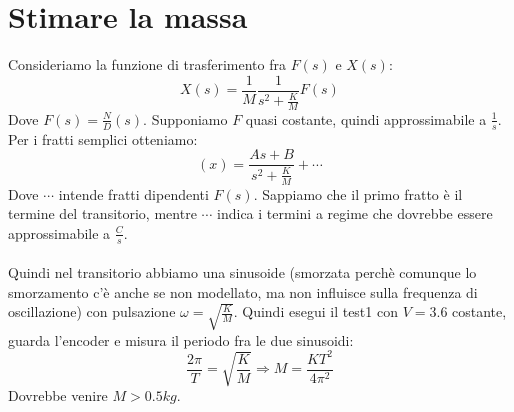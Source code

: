 \documentclass[10pt,a4paper]{article}
\begin{document}
\section{Stimare la massa}
Consideriamo la funzione di trasferimento fra $F(s)$ e $X(s)$:
$$X(s)= \frac{1}{M}\frac{1}{s^2+\frac{K}{M}}F(s)$$
Dove $F(s) = \frac{N}{D}(s)$. Supponiamo $F$ quasi costante, quindi approssimabile a $\frac{1}{s}$. Per i fratti semplici otteniamo:
$$(x) = \frac{As+B}{s^2+\frac{K}{M}}+\cdots$$
Dove $\cdots$ intende fratti dipendenti $F(s)$. Sappiamo che il primo fratto è il termine del transitorio, mentre $\cdots$  indica i termini a regime che dovrebbe essere approssimabile a $\frac{C}{s}$. \\ \\
Quindi nel transitorio abbiamo una sinusoide (smorzata perchè comunque lo smorzamento c'è anche se non modellato, ma non influisce sulla frequenza di oscillazione) con pulsazione $\omega = \sqrt{\frac{K}{M}}$. Quindi esegui il test1 con $V=3.6$ costante, guarda l'encoder e misura il periodo fra le due sinusoidi:
$$\frac{2\pi}{T}= \sqrt{\frac{K}{M}} \Rightarrow M = \frac{KT^2}{4\pi^2}$$
Dovrebbe venire $M > 0.5kg$.
\end{document}
